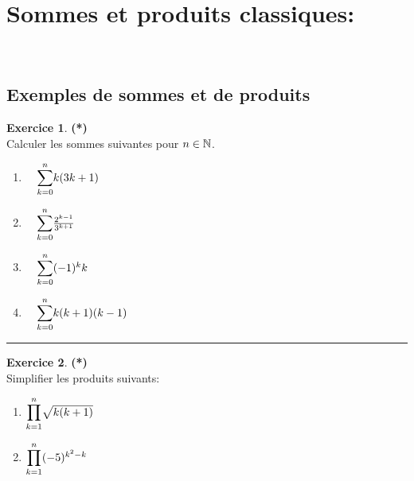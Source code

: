 \documentclass[a4paper,11pt]{article}
\theoremstyle{definition}
\newtheorem{exo}{Exercice} %
\begin{document}
 	
	

\noindent{}
\bigskip

\raggedright

\section*{Sommes et produits classiques:}\hfill\\%


\begin{minipage}{1\linewidth}
	\begin{minipage}[t]{0.48\linewidth}
		\raggedright
\subsection*{Exemples de sommes et de produits}		
\begin{exo}\textbf{(*)}\quad\\[0.2cm]
	Calculer les sommes suivantes pour $n\in\mathbb{N}$.
	\begin{multicols}{2}
		\begin{enumerate}
			\item$ \quad\mathlarger\sum\limits_{k=0}^{n}k(3k+1)$
			\item$ \quad\mathlarger\sum\limits_{k=0}^{n} \frac{2^{k-1}}{3^{k+1}}$
			\item$ \quad\mathlarger\sum\limits_{k=0}^{n}(-1)^kk$
			\item$ \quad\mathlarger\sum\limits_{k=0}^{n}k(k+1)(k-1)$
		\end{enumerate}
		  
	\end{multicols}
	
	\centering
	\rule{1\linewidth}{0.6pt}
\end{exo}

\begin{exo}\textbf{(*)}\quad\\[0.2cm]
	Simplifier les produits suivants:
	\begin{multicols}{2}
		\begin{enumerate}
			\item $\mathlarger\prod\limits_{k=1}^{n}\sqrt{k(k+1)}$
			\item$\mathlarger\prod\limits_{k=1}^{n}(-5)^{k^2-k}$
		\end{enumerate}
	\end{multicols}
	

\end{exo}
\end{minipage}
\end{minipage}
\end{document}
